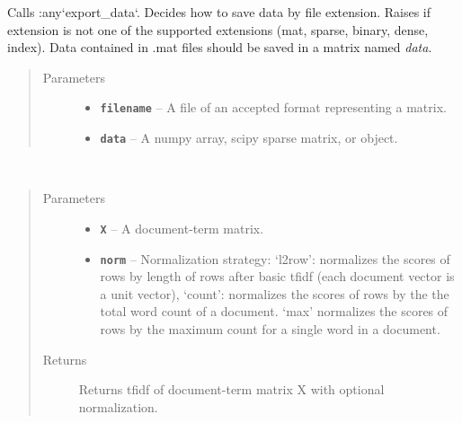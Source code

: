 \documentclass[letterpaper,10pt,english]{sphinxmanual}
\begin{document}
\begin{fulllineitems}
\label{loader:loader.save}
Calls :any{}`export\_data{}`.
Decides how to save data by file extension.
Raises {\hyperref[loader:loader.Unsupported_format_error]{\emph{}}} if extension is not one of the supported
extensions (mat, sparse, binary, dense, index).
Data contained in .mat files should be saved in a matrix named \emph{data}.
\begin{quote}\begin{description}
\item[{Parameters}] \leavevmode\begin{itemize}
\item {} 
\textbf{\texttt{filename}} -- A file of an accepted format representing a matrix.

\item {} 
\textbf{\texttt{data}} -- A numpy array, scipy sparse matrix, or {\hyperref[loader:loader.HotIndex]{\emph{}}} object.

\end{itemize}

\end{description}\end{quote}

\end{fulllineitems}


\begin{fulllineitems}
\label{loader:loader.tfidf}~\begin{quote}\begin{description}
\item[{Parameters}] \leavevmode\begin{itemize}
\item {} 
\textbf{\texttt{X}} -- A document-term matrix.

\item {} 
\textbf{\texttt{norm}} -- Normalization strategy: `l2row': normalizes the scores of rows by length of rows after basic tfidf (each document vector is a unit vector), `count': normalizes the scores of rows by the the total word count of a document. `max' normalizes the scores of rows by the maximum count for a single word in a document.

\end{itemize}

\item[{Returns}] \leavevmode
Returns tfidf of document-term matrix X with optional normalization.

\end{description}\end{quote}

\end{fulllineitems}
\end{document}
